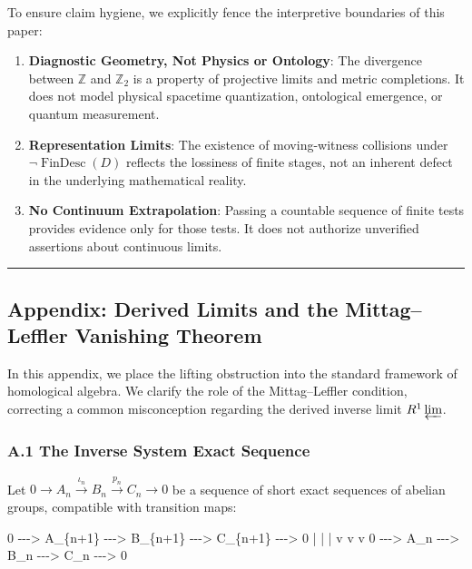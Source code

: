 \documentclass[
  11pt,
]{article}
\newenvironment{Shaded}{\begin{snugshade}}{\end{snugshade}}
\newcommand{\NormalTok}[1]{#1}
\providecommand{\tightlist}{%
  \setlength{\itemsep}{0pt}\setlength{\parskip}{0pt}}
\theoremstyle{plain}
\theoremstyle{definition}\newtheorem{definition}[theorem]{Definition}
\theoremstyle{remark}\newtheorem*{remark}{Remark}
\begin{document}
To ensure claim hygiene, we explicitly fence the interpretive boundaries
of this paper:

\begin{enumerate}
\def\labelenumi{\arabic{enumi}.}
\tightlist
\item
  \textbf{Diagnostic Geometry, Not Physics or Ontology}: The divergence
  between \(\mathbb{Z}\) and \(\mathbb{Z}_2\) is a property of
  projective limits and metric completions. It does not model physical
  spacetime quantization, ontological emergence, or quantum measurement.
\item
  \textbf{Representation Limits}: The existence of moving-witness
  collisions under \(\neg \operatorname{FinDesc}(D)\) reflects the
  lossiness of finite stages, not an inherent defect in the underlying
  mathematical reality.
\item
  \textbf{No Continuum Extrapolation}: Passing a countable sequence of
  finite tests provides evidence only for those tests. It does not
  authorize unverified assertions about continuous limits.
\end{enumerate}

\begin{center}\rule{0.5\linewidth}{0.5pt}\end{center}

\subsection{Appendix: Derived Limits and the Mittag--Leffler Vanishing
Theorem}\label{appendix-derived-limits-and-the-mittagleffler-vanishing-theorem}

In this appendix, we place the lifting obstruction into the standard
framework of homological algebra. We clarify the role of the
Mittag--Leffler condition, correcting a common misconception regarding
the derived inverse limit \(R^1 \varprojlim\).

\subsubsection{A.1 The Inverse System Exact
Sequence}\label{a.1-the-inverse-system-exact-sequence}

Let \(0 \to A_n \xrightarrow{\iota_n} B_n \xrightarrow{p_n} C_n \to 0\)
be a sequence of short exact sequences of abelian groups, compatible
with transition maps:

\begin{Shaded}
\begin{Highlighting}[]
\NormalTok{0 {-}{-}{-}\textgreater{} A\_\{n+1\} {-}{-}{-}\textgreater{} B\_\{n+1\} {-}{-}{-}\textgreater{} C\_\{n+1\} {-}{-}{-}\textgreater{} 0}
\NormalTok{         |              |              |}
\NormalTok{         v              v              v}
\NormalTok{0 {-}{-}{-}\textgreater{}   A\_n   {-}{-}{-}\textgreater{}   B\_n   {-}{-}{-}\textgreater{}   C\_n   {-}{-}{-}\textgreater{} 0}
\end{Highlighting}
\end{Shaded}
\end{document}
